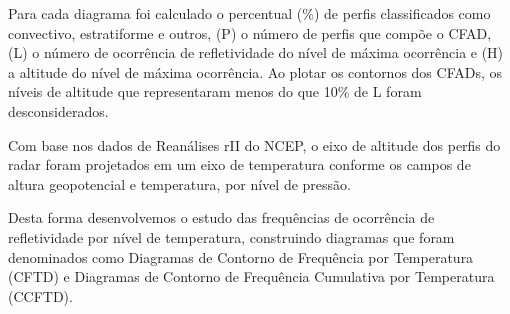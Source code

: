 Para cada diagrama foi calculado o percentual (\%) de perfis classificados como convectivo, estratiforme e outros, (P) o número de perfis que compõe o CFAD, (L) o número de ocorrência de refletividade do nível de máxima ocorrência e (H) a altitude do nível de máxima ocorrência. Ao plotar os contornos dos CFADs, os níveis de altitude que representaram menos do que 10\% de L foram desconsiderados.

Com base nos dados de Reanálises rII do NCEP, o eixo de altitude dos perfis do radar foram projetados em um eixo de temperatura conforme os campos de altura geopotencial e temperatura, por nível de pressão.

Desta forma desenvolvemos o estudo das frequências de ocorrência de refletividade por nível de temperatura, construindo diagramas que foram denominados como Diagramas de Contorno de Frequência por Temperatura (CFTD) e Diagramas de Contorno de Frequência Cumulativa por Temperatura (CCFTD).







